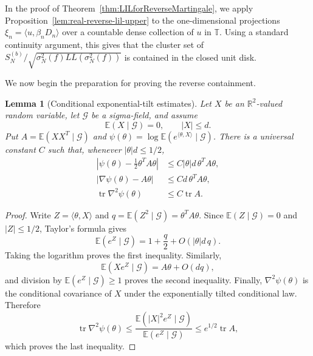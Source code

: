 \documentclass[12pt, reqno, final, a4paper]{amsart}
\theoremstyle{plain}
\newtheorem{lemma}[theorem]{Lemma}
\theoremstyle{definition}
\theoremstyle{remark}
\DeclareMathOperator{\tr}{tr}
\newcommand{\T}{\mathbb T}
\newcommand{\E}{\mathbb E}
\newcommand{\1}{\mathbf 1}
\begin{document}
In the proof of Theorem~\ref{thm:LILforReverseMartingale}, we apply Proposition~\ref{lem:real-reverse-lil-upper} to the one-dimensional projections $\xi_n=\langle u, \beta_nD_n\rangle$ over a countable dense collection of $u$ in $\T$. Using a standard continuity argument, this gives that the cluster set of $S_N^{(b)}/\sqrt{\sigma_N^2(f)LL(\sigma_N^2(f))}$ is contained in the closed unit disk. 

We now begin the preparation for proving the reverse containment. 

\begin{lemma}[Conditional exponential-tilt estimates]
\label{lem:conditional-tilt-estimates}
Let $X$ be an $\mathbb R^2$-valued random variable, let $\mathcal G$ be a
sigma-field, and assume
\[
 \E(X\mid\mathcal G)=0,\qquad |X|\le d.
\]
Put $A=\E(XX^T\mid\mathcal G)$ and
$\psi(\theta)=\log\E(e^{\langle\theta,X\rangle}\mid\mathcal G)$. There is a
universal constant $C$ such that, whenever $|\theta|d\le1/2$,
\begin{align*}
 \left|\psi(\theta)-\frac12\theta^TA\theta\right|
 &\le C|\theta|d\,\theta^TA\theta,\\
 \left|\nabla\psi(\theta)-A\theta\right|
 &\le Cd\,\theta^TA\theta,\\
 \tr\nabla^2\psi(\theta)&\le C\tr A.
\end{align*}
\end{lemma}
\begin{proof}
Write $Z=\langle\theta,X\rangle$ and $q=\E(Z^2\mid\mathcal G)
=\theta^TA\theta$. Since $\E(Z\mid\mathcal G)=0$ and $|Z|\le1/2$,
Taylor's formula gives
\[
 \E(e^Z\mid\mathcal G)=1+\frac q2+O(|\theta|d\,q).
\]
Taking the logarithm proves the first inequality. Similarly,
\[
 \E(Xe^Z\mid\mathcal G)=A\theta+O(dq),
\]
and division by $\E(e^Z\mid\mathcal G)\ge1$ proves the second inequality. Finally, $\nabla^2\psi(\theta)$ is the
conditional covariance of $X$ under the exponentially tilted conditional law.
Therefore
\[
 \tr\nabla^2\psi(\theta)
 \le\frac{\E(|X|^2e^Z\mid\mathcal G)}
          {\E(e^Z\mid\mathcal G)}
 \le e^{1/2}\tr A,
\]
which proves the last inequality.
\end{proof}
\end{document}
